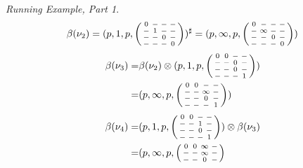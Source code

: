 \documentclass{lmcs}
\theoremstyle{remark}
\newcommand{\nopath}{-}
\newenvironment{smallpmatrix}
  {\left(\begin{smallmatrix}}
  {\end{smallmatrix}\right)}
\theoremstyle{remark}
\newtheorem{runningexample/}{Running Example, Part}
\newenvironment{runningexample}
  {\renewcommand{\qedsymbol}{\color{darkgray}\ensuremath{\lrcorner}}%
   \pushQED{\qed}\begin{runningexample/}}
  {\popQED\end{runningexample/}}
\begin{document}
\begin{runningexample}
\[
\beta(\nu_2) =(p,1, p,  \begin{smallpmatrix}
  0 & \nopath & \nopath & \nopath\\
  \nopath & 1 & \nopath & \nopath\\
  \nopath & \nopath & 0 & \nopath\\
  \nopath & \nopath & \nopath & 0
  \end{smallpmatrix}  )^\sharp 
= (p,\infty, p, \begin{smallpmatrix}
  0 & \nopath & \nopath & \nopath\\
  \nopath & \infty & \nopath & \nopath\\
  \nopath & \nopath & 0 & \nopath\\
  \nopath & \nopath & \nopath & 0
  \end{smallpmatrix})
\]
\[
\begin{split} 
\beta(\nu_3) = & \beta(\nu_2) \otimes (p,1, p, \begin{smallpmatrix}
  0 & 0 & \nopath & \nopath\\
  \nopath & \nopath & 0 & \nopath\\
  \nopath & \nopath & 0 & \nopath\\
  \nopath & \nopath & \nopath & 1
  \end{smallpmatrix}) \\
= & (p,\infty, p, \begin{smallpmatrix}
  0 & 0 & \nopath & \nopath\\
  \nopath  & \nopath & \infty & \nopath\\
  \nopath & \nopath & 0 & \nopath\\
  \nopath & \nopath & \nopath & 1
  \end{smallpmatrix})
\end{split}
\]
\[
\begin{split} 
\beta(\nu_4) = &
(p,1,p,\begin{smallpmatrix}
   0 & 0 & \nopath & \nopath\\
   \nopath  & \nopath & 1 & \nopath\\
   \nopath & \nopath & 0 & \nopath\\
   \nopath & \nopath & \nopath & 1
   \end{smallpmatrix} ) \otimes \beta(\nu_3) \\
= &
 (p,\infty, p, \begin{smallpmatrix}
0 & 0 & \infty & \nopath\\
  \nopath  & \nopath & \infty & \nopath\\
  \nopath & \nopath & 0 & \nopath\\

\end{smallpmatrix}
\end{split}\]
\end{runningexample}
\end{document}
